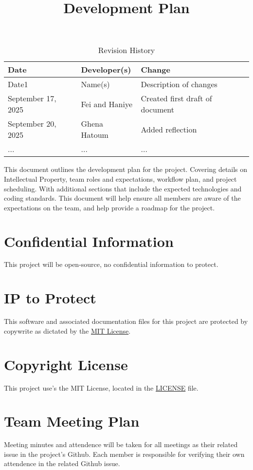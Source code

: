 \documentclass{article}
\title{Development Plan\\\progname}
\author{\authname}
\date{}
\begin{document}
\maketitle

\begin{table}[hp]
\caption{Revision History} \label{TblRevisionHistory}
\begin{tabularx}{\textwidth}{llX}
\toprule
\textbf{Date} & \textbf{Developer(s)} & \textbf{Change}\\
\midrule
Date1 & Name(s) & Description of changes\\
September 17, 2025 & Fei and Haniye & Created first draft of document\\
September 20, 2025 & Ghena Hatoum & Added reflection \\
... & ... & ...\\
\bottomrule
\end{tabularx}
\end{table}

\newpage{}
This document outlines the development plan for the project. Covering details on Intellectual Property, team roles and expectations, workflow plan, and project scheduling.
With additional sections that include the expected technologies and coding standards. This document will help ensure all members are aware of the expectations on the team, and help provide a roadmap for the project.

\section{Confidential Information}
This project will be open-source, no confidential information to protect.

\section{IP to Protect}
This software and associated documentation files for this project are protected by copywrite as dictated by the \href{https://github.com/thaafei/capstone-sfw2026/blob/main/LICENSE}{MIT License}.

\section{Copyright License}
This project use's the MIT License, located in the \href{https://github.com/thaafei/capstone-sfw2026/blob/main/LICENSE}{LICENSE} file.

\section{Team Meeting Plan}
Meeting minutes and attendence will be taken for all meetings as their related issue in the project's Github. Each member is responsible for verifying their own attendence in the related Github issue.
\end{document}

